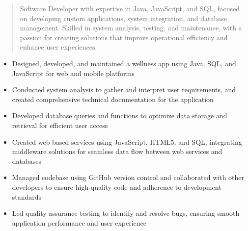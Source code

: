 



\makecvheader

\begin{quote}
  \noindent
  Software Developer with expertise in Java, JavaScript, and SQL, focused on developing custom applications, system integration, and database management. Skilled in system analysis, testing, and maintenance, with a passion for creating solutions that improve operational efficiency and enhance user experiences.
\end{quote}

\par\smallskip
\noindent
\begin{minipage}{20cm}
  \begin{minipage}{9.75cm}
    \begin{itemize}
      \item Designed, developed, and maintained a wellness app using Java, SQL, and JavaScript for web and mobile platforms
      \item Conducted system analysis to gather and interpret user requirements, and created comprehensive technical documentation for the application
      \item Developed database queries and functions to optimize data storage and retrieval for efficient user access
    \end{itemize}
  \end{minipage}
  \hfill
  \begin{minipage}{9.75cm}
    \begin{itemize}
      \item Created web-based services using JavaScript, HTML5, and SQL, integrating middleware solutions for seamless data flow between web services and databases
      \item Managed codebase using GitHub version control and collaborated with other developers to ensure high-quality code and adherence to development standards
      \item Led quality assurance testing to identify and resolve bugs, ensuring smooth application performance and user experience
    \end{itemize}
  \end{minipage}
\end{minipage}
\par\smallskip
\divider

